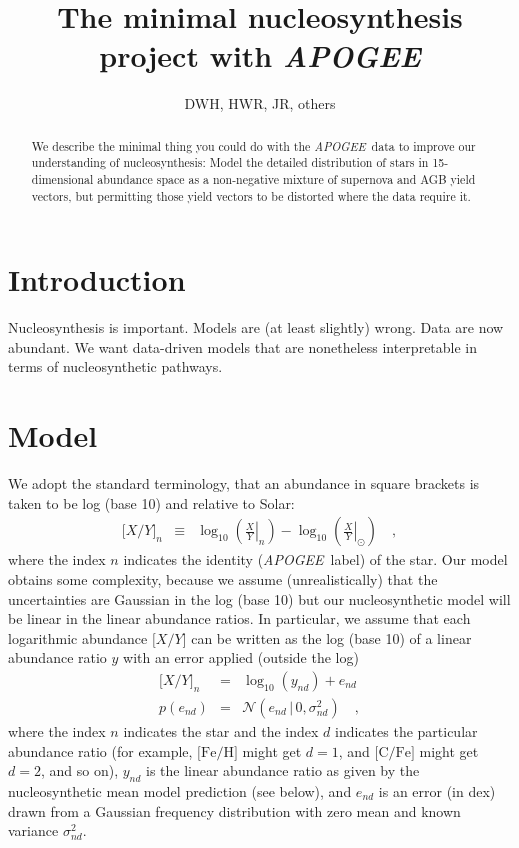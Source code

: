 \documentclass[12pt, preprint]{aastex}
\newcommand{\acronym}[1]{{\small{#1}}}
\newcommand{\project}[1]{\textsl{#1}}
\newcommand{\apogee}{\project{\acronym{APOGEE}}}
\newcommand{\solar}{\odot}
\newcommand{\abundance}[1]{\lbrack{#1}\rbrack}
\newcommand{\element}[1]{\mathrm{#1}}
\newcommand{\given}{\,|\,}
\newcommand{\normal}{\mathcal{N}}
\begin{document}
\title{The minimal nucleosynthesis project with \apogee}
\author{DWH, HWR, JR, others}

\begin{abstract}
We describe the minimal thing you could do with the \apogee\ data to
improve our understanding of nucleosynthesis:
Model the detailed distribution of stars in 15-dimensional abundance
space as a non-negative mixture of supernova and AGB yield vectors,
but permitting those yield vectors to be distorted where the data
require it.
\end{abstract}


\section{Introduction}

Nucleosynthesis is important.  Models are (at least slightly) wrong.
Data are now abundant.  We want data-driven models that are
nonetheless interpretable in terms of nucleosynthetic pathways.

\section{Model}

We adopt the standard terminology, that an abundance in square brackets
is taken to be log (base 10) and relative to Solar:
\begin{eqnarray}
  \abundance{X/Y}_n &\equiv& \log_{10}\left(\left.\frac{X}{Y}\right|_n\right) -
                             \log_{10}\left(\left.\frac{X}{Y}\right|_\solar\right)
\quad ,
\end{eqnarray}
where the index $n$ indicates the identity (\apogee\ label) of the star.
Our model obtains some complexity, because we assume (unrealistically)
that the uncertainties are Gaussian in the log (base 10) but our
nucleosynthetic model will be linear in the linear abundance ratios.
In particular, we assume that each logarithmic abundance $\abundance{X/Y}$
can be written as the log (base 10) of a linear abundance ratio $y$ with
an error applied (outside the log)
\begin{eqnarray}
  \abundance{X/Y}_n &=& \log_{10}(y_{nd}) + e_{nd} \label{eq:model1}
\\
  p(e_{nd}) &=& \normal(e_{nd}\given 0,\sigma^2_{nd}) \label{eq:model2}
\quad ,
\end{eqnarray}
where the index $n$ indicates the star and the index $d$ indicates the
particular abundance ratio (for example, $\abundance{\element{Fe}/\element{H}}$ might get
$d=1$, and $\abundance{\element{C}/\element{Fe}}$ might get $d=2$, and so on), $y_{nd}$ is
the linear abundance ratio as given by the nucleosynthetic mean model
prediction (see below), and $e_{nd}$ is an error (in dex) drawn from a Gaussian
frequency distribution with zero mean and known variance $\sigma^2_{nd}$.
\end{document}
